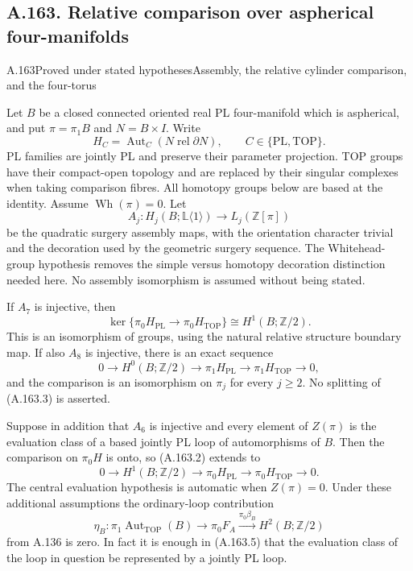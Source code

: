 \subsection{A.163. Relative comparison over aspherical four-manifolds}

\begin{saresult}{A.163}{Proved under stated hypotheses}{Assembly, the relative cylinder comparison, and the four-torus}

Let $B$ be a closed connected oriented real PL four-manifold which is
aspherical, and put $\pi=\pi_1B$ and $N=B\times I$.
Write
\[
 H_C=\operatorname{Aut}_C(N\operatorname{ rel}\partial N),
 \qquad C\in\{\mathrm{PL},\mathrm{TOP}\}.
\]
PL families are jointly PL and preserve their parameter projection.
TOP groups have their compact-open topology and are replaced by their
singular complexes when taking comparison fibres. All homotopy groups
below are based at the identity. Assume $\operatorname{Wh}(\pi)=0$.
Let
\[
 A_j:H_j(B;\mathbb L\langle1\rangle)
                 \longrightarrow L_j(\mathbb Z[\pi])                 \tag{A.163.1}
\]
be the quadratic surgery assembly maps, with the orientation character
trivial and the decoration used by the geometric surgery sequence.
The Whitehead-group hypothesis removes the simple versus homotopy
decoration distinction needed here. No assembly isomorphism is assumed
without being stated.

If $A_7$ is injective, then
\[
 \ker\{\pi_0H_{\mathrm{PL}}\longrightarrow\pi_0H_{\mathrm{TOP}}\}
                      \cong H^1(B;\mathbb Z/2).                     \tag{A.163.2}
\]
This is an isomorphism of groups, using the natural relative structure
boundary map. If also $A_8$ is injective, there is an exact sequence
\[
 0\longrightarrow H^0(B;\mathbb Z/2)
  \longrightarrow\pi_1H_{\mathrm{PL}}
  \longrightarrow\pi_1H_{\mathrm{TOP}}\longrightarrow0,             \tag{A.163.3}
\]
and the comparison is an isomorphism on $\pi_j$ for every $j\ge2$.
No splitting of (A.163.3) is asserted.

Suppose in addition that $A_6$ is injective and every element of
$Z(\pi)$ is the evaluation class of a based jointly PL loop of
automorphisms of $B$. Then the comparison on $\pi_0H$ is onto, so
(A.163.2) extends to
\[
 0\longrightarrow H^1(B;\mathbb Z/2)
  \longrightarrow\pi_0H_{\mathrm{PL}}
  \longrightarrow\pi_0H_{\mathrm{TOP}}\longrightarrow0.             \tag{A.163.4}
\]
The central evaluation hypothesis is automatic when $Z(\pi)=0$.
Under these additional assumptions the ordinary-loop contribution
\[
 \eta_B:\pi_1\operatorname{Aut}_{\mathrm{TOP}}(B)
       \longrightarrow\pi_0F_A
       \xrightarrow{\pi_0\beta_B}H^2(B;\mathbb Z/2)                 \tag{A.163.5}
\]
from A.136 is zero. In fact it is enough in (A.163.5) that the evaluation
class of the loop in question be represented by a jointly PL loop.


\end{saresult}
